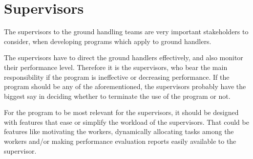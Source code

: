 \section{Supervisors}
The supervisors to the ground handling teams are very important stakeholders to consider, when developing programs which apply to ground handlers.

The supervisors have to direct the ground handlers effectively, and also monitor their performance level. Therefore it is the supervisors, who bear the main responsibility if the program is ineffective or decreasing performance. If the program should be any of the aforementioned, the supervisors probably have the biggest say in deciding whether to terminate the use of the program or not.

For the program to be most relevant for the supervisors, it should be designed with features that ease or simplify the workload of the supervisors. That could be features like motivating the workers, dynamically allocating tasks among the workers and/or making performance evaluation reports easily available to the supervisor.